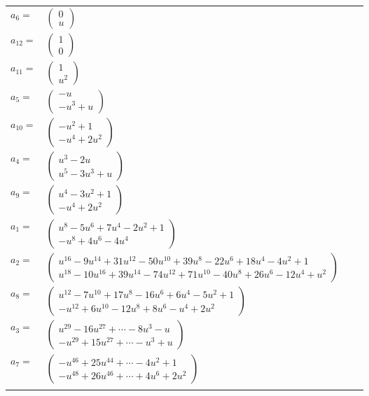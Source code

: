 \documentclass[1p]{elsarticle_modified}
\theoremstyle{definition}
\begin{document}
\begin{tabular}{m{7pt} m{180pt} m{7pt} m{180pt} }
\flushright $a_{6}=$&$\begin{pmatrix}0\\u\end{pmatrix}$ \\
\flushright $a_{12}=$&$\begin{pmatrix}1\\0\end{pmatrix}$ \\
\flushright $a_{11}=$&$\begin{pmatrix}1\\u^2\end{pmatrix}$ \\
\flushright $a_{5}=$&$\begin{pmatrix}- u\\- u^3+u\end{pmatrix}$ \\
\flushright $a_{10}=$&$\begin{pmatrix}- u^2+1\\- u^4+2 u^2\end{pmatrix}$ \\
\flushright $a_{4}=$&$\begin{pmatrix}u^3-2 u\\u^5-3 u^3+u\end{pmatrix}$ \\
\flushright $a_{9}=$&$\begin{pmatrix}u^4-3 u^2+1\\- u^4+2 u^2\end{pmatrix}$ \\
\flushright $a_{1}=$&$\begin{pmatrix}u^8-5 u^6+7 u^4-2 u^2+1\\- u^8+4 u^6-4 u^4\end{pmatrix}$ \\
\flushright $a_{2}=$&$\begin{pmatrix}u^{16}-9 u^{14}+31 u^{12}-50 u^{10}+39 u^8-22 u^6+18 u^4-4 u^2+1\\u^{18}-10 u^{16}+39 u^{14}-74 u^{12}+71 u^{10}-40 u^8+26 u^6-12 u^4+u^2\end{pmatrix}$ \\
\flushright $a_{8}=$&$\begin{pmatrix}u^{12}-7 u^{10}+17 u^8-16 u^6+6 u^4-5 u^2+1\\- u^{12}+6 u^{10}-12 u^8+8 u^6- u^4+2 u^2\end{pmatrix}$ \\
\flushright $a_{3}=$&$\begin{pmatrix}u^{29}-16 u^{27}+\cdots-8 u^3- u\\- u^{29}+15 u^{27}+\cdots- u^3+u\end{pmatrix}$ \\
\flushright $a_{7}=$&$\begin{pmatrix}- u^{46}+25 u^{44}+\cdots-4 u^2+1\\- u^{48}+26 u^{46}+\cdots+4 u^6+2 u^2\end{pmatrix}$\\&\end{tabular}
\end{document}
